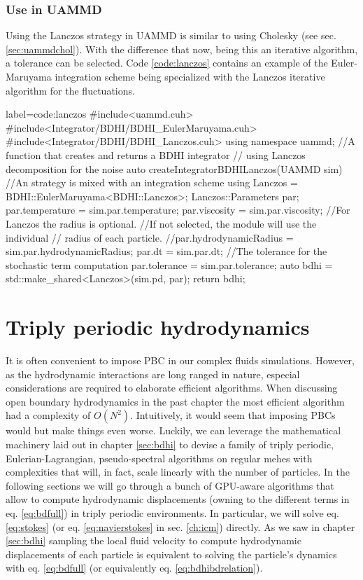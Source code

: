 \documentclass[ twoside,openright,titlepage,numbers=noenddot,%
headinclude,footinclude,cleardoublepage=empty,abstract=on,
BCOR=5mm,paper=a4,fontsize=11pt, dvipsnames
]{scrreprt}
\newcommand{\uammd}{\gls{UAMMD}\xspace}
\begin{document}
\subsection*{Use in UAMMD}
Using the Lanczos strategy in \uammd is similar to using Cholesky (see sec. \ref{sec:uammdchol}). With the difference that now, being this an iterative algorithm, a tolerance can be selected.
Code \ref{code:lanczos} contains an example of the Euler-Maruyama integration scheme being specialized with the Lanczos iterative algorithm for the fluctuations.
\begin{code2}    {label=code:lanczos}
#include<uammd.cuh>
#include<Integrator/BDHI/BDHI_EulerMaruyama.cuh>
#include<Integrator/BDHI/BDHI_Lanczos.cuh>
using namespace uammd;
//A function that creates and returns a BDHI integrator
// using Lanczos decomposition for the noise
auto createIntegratorBDHILanczos(UAMMD sim){   
  //An strategy is mixed with an integration scheme
  using Lanczos = BDHI::EulerMaruyama<BDHI::Lanczos>;
  Lanczos::Parameters par;
  par.temperature = sim.par.temperature;
  par.viscosity = sim.par.viscosity;
  //For Lanczos the radius is optional.
  //If not selected, the module will use the individual 
  //  radius of each particle.
  //par.hydrodynamicRadius = sim.par.hydrodynamicRadius;
  par.dt = sim.par.dt;
  //The tolerance for the stochastic term computation
  par.tolerance = sim.par.tolerance;
  auto bdhi = std::make_shared<Lanczos>(sim.pd, par);
  return bdhi;
}
\end{code2}

\newpage
\chapter{Triply periodic hydrodynamics}
It is often convenient to impose \gls{PBC} in our complex fluids simulations. However, as the hydrodynamic interactions are long ranged in nature, especial considerations are required to elaborate efficient algorithms. When discussing open boundary hydrodynamics in the past chapter the most efficient algorithm had a complexity of $O(N^2)$. Intuitively, it would seem that imposing \glspl{PBC} would but make things even worse. Luckily, we can leverage the mathematical machinery laid out in chapter \ref{sec:bdhi} to devise a family of triply periodic, Eulerian-Lagrangian, pseudo-spectral algorithms on regular mehes with complexities that will, in fact, scale linearly with the number of particles. In the following sections we will go through a bunch of GPU-aware algorithms that allow to compute hydrodynamic displacements (owning to the different terms in eq. \eqref{eq:bdfull}) in triply periodic environments. In particular, we will solve eq. \eqref{eq:stokes} (or eq. \eqref{eq:navierstokes} in sec. \ref{ch:icm}) directly. As we saw in chapter \ref{sec:bdhi} sampling the local fluid velocity to compute hydrodynamic displacements of each particle is equivalent to solving the particle's dynamics with eq. \eqref{eq:bdfull} (or equivalently eq. \eqref{eq:bdhibdrelation}).
\end{document}
